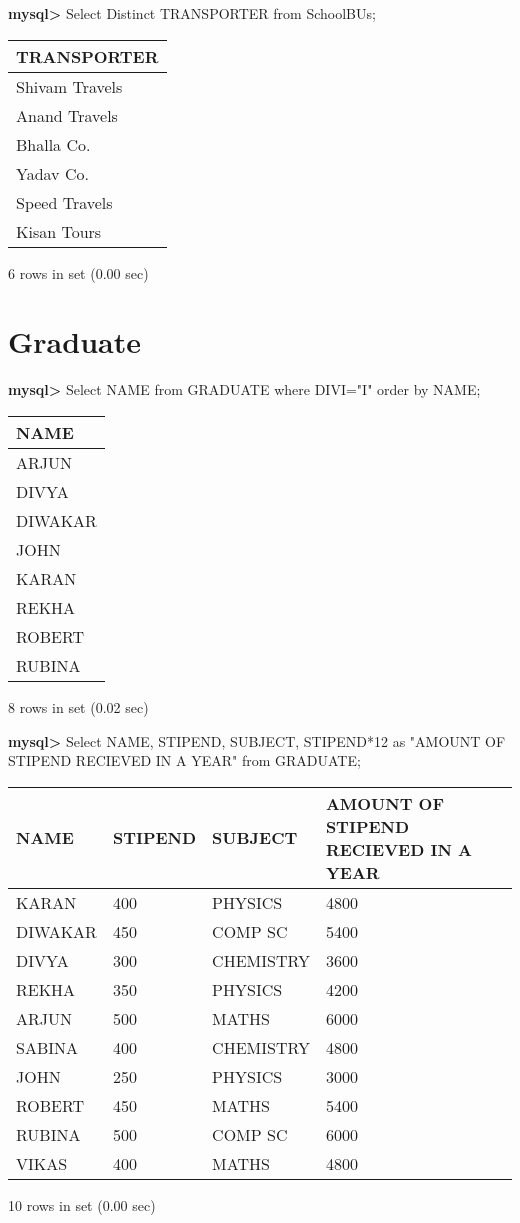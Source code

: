 \documentclass[11pt]{article}
\begin{document}
\textbf{mysql>} Select Distinct TRANSPORTER from SchoolBUs;
\begin{center}
\begin{tabular}{|l|}
\hline
TRANSPORTER \\
\hline
Shivam Travels \\
Anand Travels \\
Bhalla Co. \\
Yadav Co. \\
Speed Travels \\
Kisan Tours \\
\hline
\end{tabular}
\end{center}
6 rows in set (0.00 sec)

\section{Graduate}
\label{sec:org99d86cb}
\textbf{mysql>} Select NAME from GRADUATE where DIVI="I" order by NAME;
\begin{center}
\begin{tabular}{|l|}
\hline
NAME \\
\hline
ARJUN \\
DIVYA \\
DIWAKAR \\
JOHN \\
KARAN \\
REKHA \\
ROBERT \\
RUBINA \\
\hline
\end{tabular}
\end{center}
8 rows in set (0.02 sec)

\textbf{mysql>} Select NAME, STIPEND, SUBJECT, STIPEND*12 as "AMOUNT OF STIPEND RECIEVED IN A YEAR" from GRADUATE;
\begin{center}
\begin{tabular}{|l|l|l|l|}
\hline
NAME & STIPEND & SUBJECT & AMOUNT OF STIPEND RECIEVED IN A YEAR \\
\hline
KARAN & 400 & PHYSICS & 4800 \\
DIWAKAR & 450 & COMP SC & 5400 \\
DIVYA & 300 & CHEMISTRY & 3600 \\
REKHA & 350 & PHYSICS & 4200 \\
ARJUN & 500 & MATHS & 6000 \\
SABINA & 400 & CHEMISTRY & 4800 \\
JOHN & 250 & PHYSICS & 3000 \\
ROBERT & 450 & MATHS & 5400 \\
RUBINA & 500 & COMP SC & 6000 \\
VIKAS & 400 & MATHS & 4800 \\
\hline
\end{tabular}
\end{center}
10 rows in set (0.00 sec)
\end{document}
